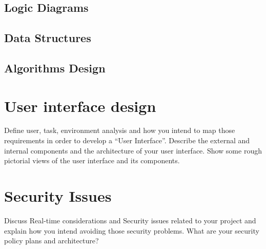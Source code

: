 



\subsection{Logic Diagrams}

\subsection{Data Structures}

\subsection{Algorithms Design}

\section{User interface design}
Define user, task, environment analysis and how you intend to map those requirements in order to develop a “User Interface”. Describe the external and internal components and the architecture of your user interface. Show some rough pictorial views of the user interface and its components.

\section{Security Issues}
Discuss Real-time considerations and Security issues related to your project and explain how you intend avoiding those security problems. What are your security policy plans and architecture?


